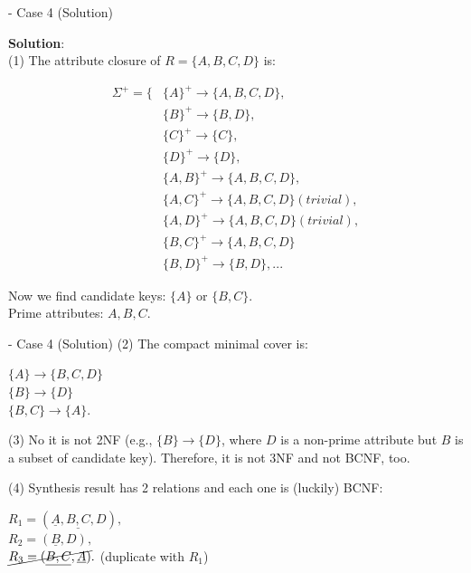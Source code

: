 \begin{frame}[fragile]{ - Case 4 (Solution)}
	
	\textbf{Solution}:\\
	(1) The attribute closure of $R = \{A, B, C, D\}$ is:\\\vspace{5pt}
	\begin{scriptsize}
		\begin{align*} 
			\Sigma^{+} = \{&\{A\}^{+} \rightarrow \{A, B, C, D\},\\
			&\{B\}^{+} \rightarrow \{B, D\},\\
			&\{C\}^{+} \rightarrow \{C\},\\
			&\{D\}^{+} \rightarrow \{D\},\\
			&\{A, B\}^{+} \rightarrow \{A, B, C, D\},\\
			&\{A, C\}^{+} \rightarrow \{A, B, C, D\} (trivial),\\
			&\{A, D\}^{+} \rightarrow \{A, B, C, D\} (trivial),\\
			&\{B, C\}^{+} \rightarrow \{A, B, C, D\}\\
			&\{B, D\}^{+} \rightarrow \{B, D\}, ...
		\end{align*}
	\end{scriptsize}
	
	Now we find candidate keys: $\{A\}$ or $\{B, C\}$.\\
	Prime attributes: $A, B, C$.
\end{frame}

\begin{frame}[fragile]{ - Case 4 (Solution)}
	(2) The compact minimal cover is:\\\vspace{5pt}
	
	$\{A\} \rightarrow \{B, C, D\}$\\
	$\{B\} \rightarrow \{D\}$\\
	$\{B, C\} \rightarrow \{A\}$.\\\vspace{5pt}
	
	(3) No it is not 2NF (e.g., $\{B\} \rightarrow \{D\}$, where $D$ is a non-prime attribute but $B$ is a subset of candidate key). Therefore, it is not 3NF and not BCNF, too.\\\vspace{5pt}
	
	(4) Synthesis result has 2 relations and each one is (luckily) BCNF: \\\vspace{5pt}
	
	$R_1 = (\underline{A}, \underline{B, C}, D),$\\\vspace{2pt}
	$R_2 = (\underline{B}, D),$\\\vspace{1pt}
	$\cancel{R_3 = (\underline{B, C}, \underline{A})}.$ (duplicate with $R_1$)\\\vspace{5pt}
	
\end{frame}


